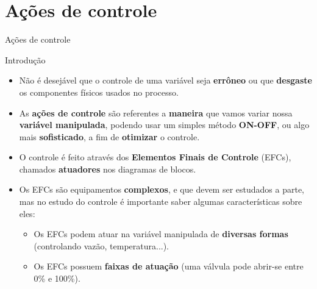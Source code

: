 \section{Ações de controle}


\begin{frame}{Ações de controle}
	\begin{block}{Introdução}
		\begin{itemize}
			\item Não é desejável que o controle de uma variável seja \textbf{errôneo} ou que \textbf{desgaste} os componentes físicos usados no processo.
			\item As \textbf{ações de controle} são referentes a \textbf{maneira} que vamos variar nossa \textbf{variável manipulada}, podendo usar um simples método \textbf{ON-OFF}, ou algo mais \textbf{sofisticado}, a fim de \textbf{otimizar} o controle.
			\item O controle é feito através dos \textbf{Elementos Finais de Controle} (EFCs), chamados \textbf{atuadores} nos diagramas de blocos.
			\item Os EFCs são equipamentos \textbf{complexos}, e que devem ser estudados a parte, mas no estudo do controle é importante saber algumas características sobre eles:
			\begin{itemize}
				\item Os EFCs podem atuar na variável manipulada de \textbf{diversas formas} (controlando vazão, temperatura...).
				\item Os EFCs possuem \textbf{faixas de atuação} (uma válvula pode abrir-se entre 0\% e 100\%).
			\end{itemize}
		\end{itemize}
	\end{block}
\end{frame}


